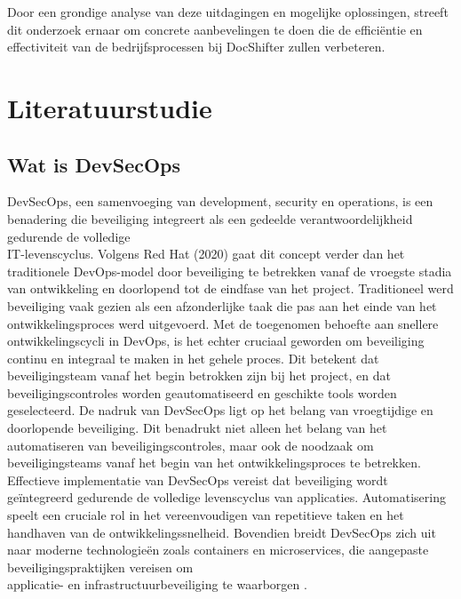 \documentclass{hogent-article}
\begin{document}
    \noindent Door een grondige analyse van deze uitdagingen en mogelijke oplossingen, streeft dit onderzoek ernaar om concrete aanbevelingen te doen die de efficiëntie en effectiviteit van de bedrijfsprocessen bij DocShifter zullen verbeteren.
    
    
    
    
    
   \section{Literatuurstudie}%
   \label{sec:literatuurstudie}
   \subsection{Wat is DevSecOps}
   DevSecOps, een samenvoeging van development, security en operations, is een benadering die beveiliging integreert als een gedeelde verantwoordelijkheid gedurende de volledige \\ IT-levenscyclus. Volgens Red Hat (2020) gaat dit concept verder dan het traditionele DevOps-model door beveiliging te betrekken vanaf de vroegste stadia van ontwikkeling en doorlopend tot de eindfase van het project.
   Traditioneel werd beveiliging vaak gezien als een afzonderlijke taak die pas aan het einde van het ontwikkelingsproces werd uitgevoerd. Met de toegenomen behoefte aan snellere ontwikkelingscycli in DevOps, is het echter cruciaal geworden om beveiliging continu en integraal te maken in het gehele proces. Dit betekent dat beveiligingsteam vanaf het begin betrokken zijn bij het project, en dat beveiligingscontroles worden geautomatiseerd en geschikte tools worden geselecteerd.
   De nadruk van DevSecOps ligt op het belang van vroegtijdige en doorlopende beveiliging. Dit benadrukt niet alleen het belang van het automatiseren van beveiligingscontroles, maar ook de noodzaak om beveiligingsteams vanaf het begin van het ontwikkelingsproces te betrekken.
   Effectieve implementatie van DevSecOps vereist dat beveiliging wordt geïntegreerd gedurende de volledige levenscyclus van applicaties. Automatisering speelt een cruciale rol in het vereenvoudigen van repetitieve taken en het handhaven van de ontwikkelingssnelheid. Bovendien breidt DevSecOps zich uit naar moderne technologieën zoals containers en microservices, die aangepaste beveiligingspraktijken vereisen om \\ applicatie- en infrastructuurbeveiliging te waarborgen \autocite{redhat2023}.
   
\end{document}

